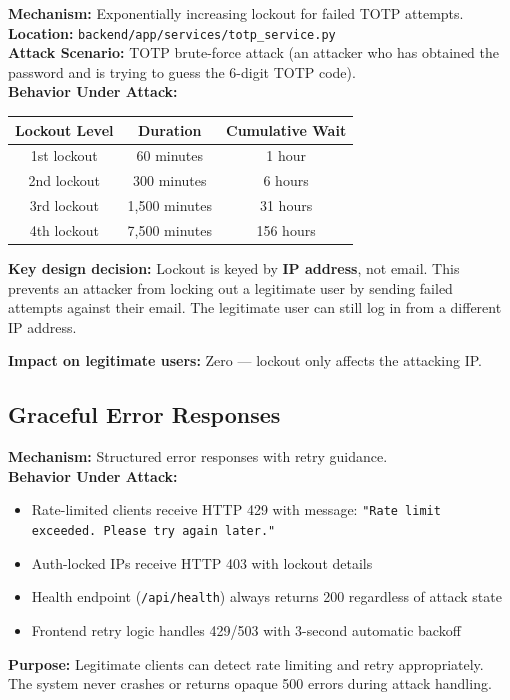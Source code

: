 \documentclass[11pt,a4paper]{article}
\begin{document}
\begin{tcolorbox}[colback=toleranceamber!5, colframe=toleranceamber]
\textbf{Mechanism:} Exponentially increasing lockout for failed TOTP attempts.\\
\textbf{Location:} \texttt{backend/app/services/totp\_service.py}\\
\textbf{Attack Scenario:} TOTP brute-force attack (an attacker who has obtained the password and is trying to guess the 6-digit TOTP code).\\
\textbf{Behavior Under Attack:}
\begin{center}
\begin{tabular}{ccc}
\toprule
\textbf{Lockout Level} & \textbf{Duration} & \textbf{Cumulative Wait} \\
\midrule
1st lockout & 60 minutes & 1 hour \\
2nd lockout & 300 minutes & 6 hours \\
3rd lockout & 1,500 minutes & 31 hours \\
4th lockout & 7,500 minutes & 156 hours \\
\bottomrule
\end{tabular}
\end{center}
\textbf{Key design decision:} Lockout is keyed by \textbf{IP address}, not email. This prevents an attacker from locking out a legitimate user by sending failed attempts against their email. The legitimate user can still log in from a different IP address.

\textbf{Impact on legitimate users:} Zero — lockout only affects the attacking IP.
\end{tcolorbox}

\subsection{Graceful Error Responses}

\begin{tcolorbox}[colback=toleranceamber!5, colframe=toleranceamber]
\textbf{Mechanism:} Structured error responses with retry guidance.\\
\textbf{Behavior Under Attack:}
\begin{itemize}[nosep]
  \item Rate-limited clients receive HTTP 429 with message: \texttt{"Rate limit exceeded. Please try again later."}
  \item Auth-locked IPs receive HTTP 403 with lockout details
  \item Health endpoint (\texttt{/api/health}) always returns 200 regardless of attack state
  \item Frontend retry logic handles 429/503 with 3-second automatic backoff
\end{itemize}
\textbf{Purpose:} Legitimate clients can detect rate limiting and retry appropriately. The system never crashes or returns opaque 500 errors during attack handling.
\end{tcolorbox}
\end{document}
